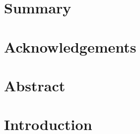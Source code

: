 \documentclass[12pt,a4paper]{report}
\newcommand{\todo}[1]{%
  \par\noindent%
  \begin{tcolorbox}[colback=yellow, colframe=black, boxrule=0.5pt, sharp corners, width=\linewidth, before skip=5pt, after skip=5pt]
    \textbf{TODO:} #1
  \end{tcolorbox}%
  \par
}
\newcommand{\remark}[1]{%
  \par\noindent%
  \begin{tcolorbox}[ colback=orange!20!white, colframe=orange!80!black, boxrule=0.5pt, sharp corners, width=\linewidth, ]
    {\textbf{\textcolor{orange!80!black}!REMARK:}}~#1
  \end{tcolorbox}%
}
\begin{document}
\chapter*{Summary}

\chapter*{Acknowledgements}

\chapter*{Abstract}




\chapter{Introduction}
\setcounter{page}{1}
\end{document}
